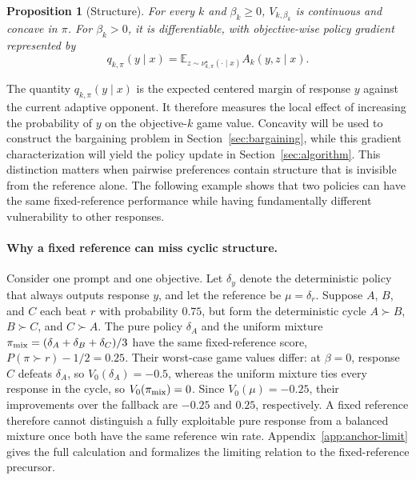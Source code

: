 \documentclass{article}
\newtheorem{proposition}{Proposition}
\theoremstyle{remark}
\theoremstyle{plain}
\newcommand{\E}{\mathbb{E}}
\begin{document}
\begin{proposition}[Structure]
\label{prop:game-structure}
For every $k$ and $\beta_k\ge0$, $V_{k,\beta_k}$ is continuous and
concave in $\pi$. For $\beta_k>0$, it is differentiable, with
objective-wise policy gradient represented by
\begin{equation}
q_{k,\pi}(y\mid x)
=
\E_{z\sim\nu^\star_{k,\pi}(\cdot\mid x)}
A_k(y,z\mid x).
\label{eq:game-gradient}
\end{equation}
\end{proposition}
The quantity $q_{k,\pi}(y\mid x)$ is the expected centered margin of
response $y$ against the current adaptive opponent. It therefore measures
the local effect of increasing the probability of $y$ on the objective-$k$
game value. Concavity will be used to construct the bargaining problem in
Section~\ref{sec:bargaining}, while this gradient characterization will
yield the policy update in Section~\ref{sec:algorithm}. This distinction matters when pairwise preferences contain structure that is invisible from the reference alone. The following example shows that two policies can have the same fixed-reference performance while having fundamentally different vulnerability to other responses.

\paragraph{Why a fixed reference can miss cyclic structure.}
Consider one prompt and one objective. Let $\delta_y$ denote the deterministic policy that always outputs response $y$, and let the reference be $\mu=\delta_r$. Suppose $A$, $B$, and $C$ each beat $r$ with probability $0.75$, but form the deterministic cycle $A\succ B$, $B\succ C$, and $C\succ A$. The pure policy $\delta_A$ and the uniform mixture $\pi_{\rm mix}=(\delta_A+\delta_B+\delta_C)/3$ have the same fixed-reference score, $P(\pi\succ r)-1/2=0.25$. Their worst-case game values differ: at $\beta=0$, response $C$ defeats $\delta_A$, so $V_0(\delta_A)=-0.5$, whereas the uniform mixture ties every response in the cycle, so $V_0(\pi_{\rm mix})=0$. Since $V_0(\mu)=-0.25$, their improvements over the fallback are $-0.25$ and $0.25$, respectively. A fixed reference therefore cannot distinguish a fully exploitable pure response from a balanced mixture once both have the same reference win rate. Appendix~\ref{app:anchor-limit} gives the full calculation and formalizes the limiting relation to the fixed-reference precursor.
\end{document}
